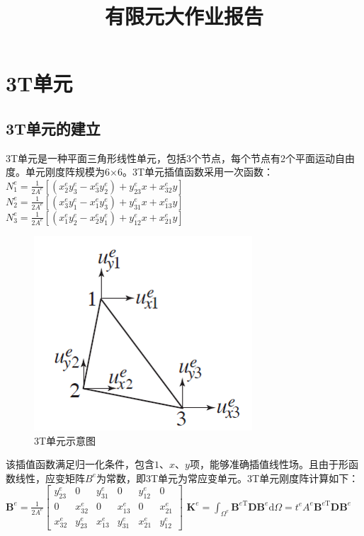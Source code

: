 \documentclass{ctexart}
\begin{document}
\title{有限元大作业报告}
\maketitle

\section {3T单元}
\subsection {3T单元的建立}
3T单元是一种平面三角形线性单元，包括3个节点，每个节点有2个平面运动自由度。单元刚度阵规模为6×6。3T单元插值函数采用一次函数：
$ N_{1}^{e}=\frac{1}{2 A^{e}}\left[\left(x_{2}^{e} y_{3}^{e}-x_{3}^{e} y_{2}^{e}\right)+y_{23}^{e} x+x_{32}^{e} y\right] $
$ N_{2}^{e}=\frac{1}{2 A^{e}}\left[\left(x_{3}^{e} y_{1}^{e}-x_{1}^{e} y_{3}^{e}\right)+y_{31}^{e} x+x_{13}^{e} y\right] $
$ N_{3}^{e}=\frac{1}{2 A^{e}}\left[\left(x_{1}^{e} y_{2}^{e}-x_{2}^{e} y_{1}^{e}\right)+y_{12}^{e} x+x_{21}^{e} y\right] $

\begin{figure}[H]
\centering  
\includegraphics[width = .4\textwidth]{t3_1.png} 
\caption{3T单元示意图} 
\label{f1.1} 
\end{figure}

该插值函数满足归一化条件，包含$ 1、x、y $项，能够准确插值线性场。且由于形函数线性，应变矩阵$ B^{e} $为常数，即3T单元为常应变单元。3T单元刚度阵计算如下：
$ \boldsymbol{B}^{e}=\frac{1}{2 A^{e}}\left[\begin{array}{cccccc}{y_{23}^{e}} & {0} & {y_{31}^{e}} & {0} & {y_{12}^{e}} & {0} \\ {0} & {x_{32}^{e}} & {0} & {x_{13}^{e}} & {0} & {x_{21}^{e}} \\ {x_{32}^{e}} & {y_{23}^{e}} & {x_{13}^{e}} & {y_{31}^{e}} & {x_{21}^{e}} & {y_{12}^{e}}\end{array}\right] $
$ \boldsymbol{K}^{e}=\int_{\Omega^{e}} \boldsymbol{B}^{e \mathrm{T}} \boldsymbol{D} \boldsymbol{B}^{e} \mathrm{d} \Omega=t^{e} A^{e} \boldsymbol{B}^{e \mathrm{T}} \boldsymbol{D} \boldsymbol{B}^{e} $
\end{document}
